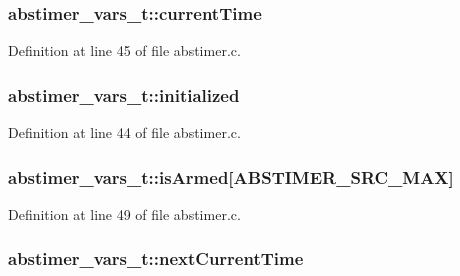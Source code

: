 \subsubsection[{\texorpdfstring{current\+Time}{currentTime}}]{ abstimer\+\_\+vars\+\_\+t\+::current\+Time}\hypertarget{structabstimer__vars__t_af445fceae21f678f000d9f33c8515530}{}\label{structabstimer__vars__t_af445fceae21f678f000d9f33c8515530}


Definition at line 45 of file abstimer.\+c.

\subsubsection[{\texorpdfstring{initialized}{initialized}}]{ abstimer\+\_\+vars\+\_\+t\+::initialized}\hypertarget{structabstimer__vars__t_ae5ac4e9c7a89a73cc062a117e174f95a}{}\label{structabstimer__vars__t_ae5ac4e9c7a89a73cc062a117e174f95a}


Definition at line 44 of file abstimer.\+c.

\subsubsection[{\texorpdfstring{is\+Armed}{isArmed}}]{ abstimer\+\_\+vars\+\_\+t\+::is\+Armed\mbox{[}{\bf A\+B\+S\+T\+I\+M\+E\+R\+\_\+\+S\+R\+C\+\_\+\+M\+AX}\mbox{]}}\hypertarget{structabstimer__vars__t_afce882cb29c654e7d2ebe2cad98f205d}{}\label{structabstimer__vars__t_afce882cb29c654e7d2ebe2cad98f205d}


Definition at line 49 of file abstimer.\+c.

\subsubsection[{\texorpdfstring{next\+Current\+Time}{nextCurrentTime}}]{ abstimer\+\_\+vars\+\_\+t\+::next\+Current\+Time}\hypertarget{structabstimer__vars__t_a94565da5d1736339a478ce18186e92d9}{}\label{structabstimer__vars__t_a94565da5d1736339a478ce18186e92d9}


